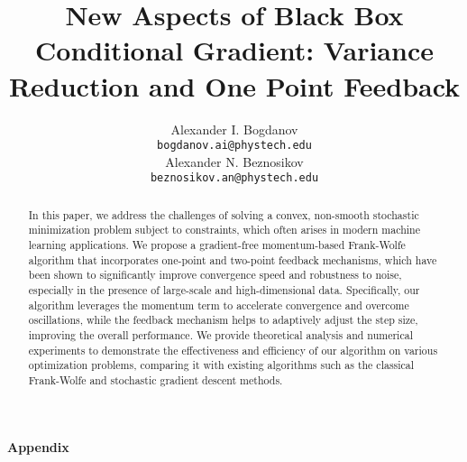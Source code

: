 \documentclass{article}
\title{New Aspects of Black Box Conditional Gradient: Variance Reduction and One Point Feedback}
\author{
    Alexander I. Bogdanov\\
	\texttt{bogdanov.ai@phystech.edu} \\
    \And
    Alexander N. Beznosikov\\
	\texttt{beznosikov.an@phystech.edu} \\
}
\date{}
\begin{document}
\maketitle

\begin{abstract}


    In this paper, we address the challenges of solving a convex, non-smooth stochastic minimization problem subject to constraints, which often arises in modern machine learning applications. We propose a gradient-free momentum-based Frank-Wolfe algorithm that incorporates one-point and two-point feedback mechanisms, which have been shown to significantly improve convergence speed and robustness to noise, especially in the presence of large-scale and high-dimensional data. Specifically, our algorithm leverages the momentum term to accelerate convergence and overcome oscillations, while the feedback mechanism helps to adaptively adjust the step size, improving the overall performance. We provide theoretical analysis and numerical experiments to demonstrate the effectiveness and efficiency of our algorithm on various optimization problems, comparing it with existing algorithms such as the classical Frank-Wolfe and stochastic gradient descent methods.

\end{abstract}








        

  

\newpage


    
%    



\begin{center}
    \LARGE \textbf{Appendix}
\end{center}
\normalsize

\appendix


    
\end{document}
